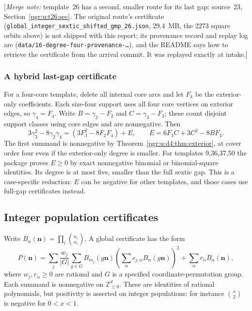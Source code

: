 \documentclass[11pt]{article}
\numberwithin{equation}{section}
\theoremstyle{definition}\newtheorem{definition}[theorem]{Definition}\newtheorem{remark}[theorem]{Remark}
\newcommand{\N}{\mathbb Z_{\ge0}}          %
\newcommand{\mnote}[1]{[\textit{Merge note:} #1]}
\begin{document}
\mnote{template~26 has a second, smaller route for its last gap: source~23,
Section~\ref{pgr:u:t26:sec}. The original route's certificate
(\texttt{global\_integer\_sextic\_shifted\_gmp\_26.json}, 29.4~MB, the 2273
square orbits above) is not shipped with this report; its provenance
record and replay log are (\texttt{data/16-degree-four-provenance-\dots}),
and the README says how to retrieve the certificate from the arrival
commit. It was replayed exactly at intake.}


\subsubsection{A hybrid last-gap certificate}
For a four-core template, delete all internal core arcs and let $F_k$ be the exterior-only coefficients. Each size-four support uses all four core vertices on exterior edges, so $\gamma_4=F_4$. Write $B=\gamma_2-F_2$ and $C=\gamma_3-F_3$; these count disjoint support classes using core edges and are nonnegative. Then
\begin{equation}\label{pgr:u:d4:eq:hybrid}
 3\gamma_3^2-8\gamma_2\gamma_4
 =(3F_3^2-8F_2F_4)+E,\qquad
 E=6F_3C+3C^2-8BF_4.
\end{equation}
The first summand is nonnegative by Theorem~\ref{pgr:u:d4:thm:exterior}, at cover order four even if the exterior-only degree is smaller. For templates 9,36,37,50 the package proves $E\ge0$ by exact nonnegative binomial or binomial-square identities. Its degree is at most five, smaller than the full sextic gap. This is a case-specific reduction: $E$ can be negative for other templates, and those cases use full-gap certificates instead.

\subsection{Integer population certificates}
Write $B_\alpha(\mathbf n)=\prod_i\binom{n_i}{\alpha_i}$. A global certificate has the form
\begin{equation}\label{pgr:u:d4:eq:cert}
 P(\mathbf n)=\sum_j\frac{w_j}{|G|}\sum_{g\in G}B_{m_j}(g\mathbf n)
       \left(\sum_\alpha c_{j,\alpha}B_\alpha(g\mathbf n)\right)^2
       +\sum_\alpha r_\alpha B_\alpha(\mathbf n),
\end{equation}
where $w_j,r_\alpha\ge0$ are rational and $G$ is a specified coordinate-permutation group. Each summand is nonnegative on $\N^d$. These are identities of rational polynomials, but positivity is asserted on integer populations: for instance $\binom{x}{2}$ is negative for $0<x<1$.
\end{document}
